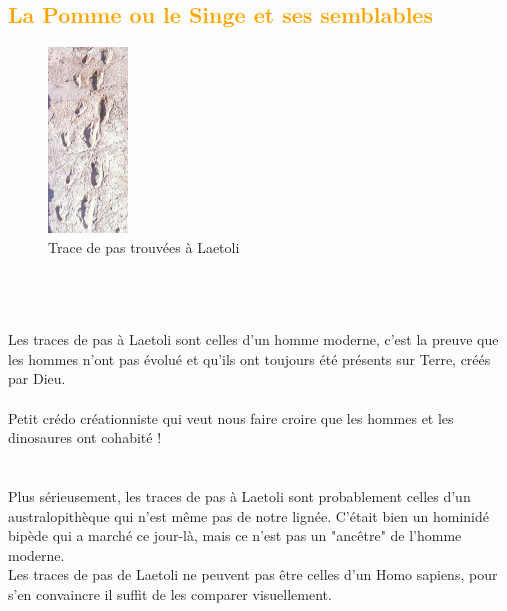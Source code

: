 \setcounter{chapter}{0}
\textcolor{orange}{\chapter{La Pomme ou le Singe et ses semblables}}
		\begin{figure}
	\includegraphics[width=80px]{img7.png}
	\caption{Trace de pas trouvées à Laetoli}
\end{figure}
\\ \\ \\
	Les traces de pas à Laetoli sont celles d'un homme moderne, c'est la preuve 
	que les hommes n'ont pas évolué et qu'ils ont toujours été présents sur 
	Terre, créés par Dieu.\\ \\
	Petit crédo créationniste qui veut nous faire croire que les hommes et les
	dinosaures ont cohabité !\\ \\  \\

	Plus sérieusement, les traces de pas à Laetoli sont probablement celles d'un 
	australopithèque qui n'est même pas de notre lignée. C'était bien un 
	hominidé bipède qui a marché ce jour-là, mais ce n'est pas un "ancêtre" de 
	l'homme moderne.\\
Les traces de pas de Laetoli ne peuvent pas être celles d'un Homo sapiens, pour 
s'en convaincre il suffit de les comparer visuellement.\\ \\ \\ \\ \\

